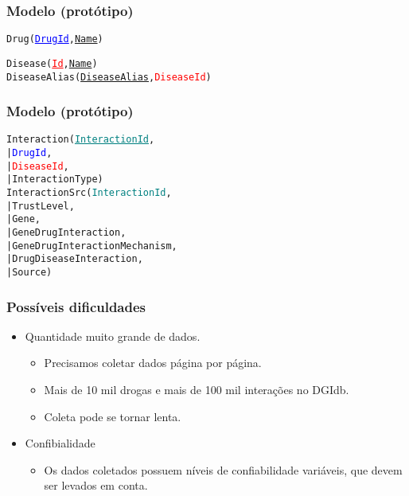 \documentclass[12pt]{beamer}
\begin{document}
\begin{frame}[fragile]
  \frametitle{Modelo (protótipo)}

  \begin{alltt}
    Drug(\textcolor{blue}{\underline{DrugId}},\underline{Name})

    Disease(\textcolor{red}{\underline{Id}}, \underline{Name})
    DiseaseAlias(\underline{DiseaseAlias}, \textcolor{red}{DiseaseId})
  \end{alltt}
\end{frame}

\begin{frame}[fragile]
  \frametitle{Modelo (protótipo)}

  \begin{alltt}
    Interaction(\textcolor{teal}{\underline{InteractionId}},
    |           \textcolor{blue}{DrugId},
    |           \textcolor{red}{DiseaseId},
    |           InteractionType)
    InteractionSrc(\textcolor{teal}{InteractionId},
    |              TrustLevel,
    |              Gene,
    |              GeneDrugInteraction,
    |              GeneDrugInteractionMechanism,
    |              DrugDiseaseInteraction,
    |              Source)
  \end{alltt}
\end{frame}

\begin{frame}
  \frametitle{Possíveis dificuldades}

  \begin{itemize}
    \item Quantidade muito grande de dados.
          \begin{itemize}
            \item Precisamos coletar dados página por página.
            \item Mais de 10 mil drogas e mais de 100 mil interações no DGIdb.
            \item Coleta pode se tornar lenta.
          \end{itemize}
    \item Confibialidade
          \begin{itemize}
            \item Os dados coletados possuem níveis de confiabilidade
                  variáveis, que devem ser levados em conta.
          \end{itemize}
  \end{itemize}
\end{frame}
\end{document}
